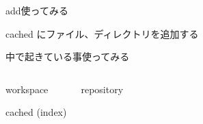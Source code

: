 
\begin{frame}[t]{add}{使ってみる}

  cached にファイル、ディレクトリを追加する
  \vspace{4ex}



\end{frame}


\begin{frame}[t]{中で起きている事}{使ってみる}

  \begin{columns}

    \begin{narrowcolumn}

      \begin{block}{workspace}
      \end{block}

      \begin{block}{cached (index)}
      \end{block}

    \end{narrowcolumn}

    \begin{halfcolumn}
      \begin{repository}{repository}
      \end{repository}
    \end{halfcolumn}

  \end{columns}
  \vspace{2ex}



\end{frame}


